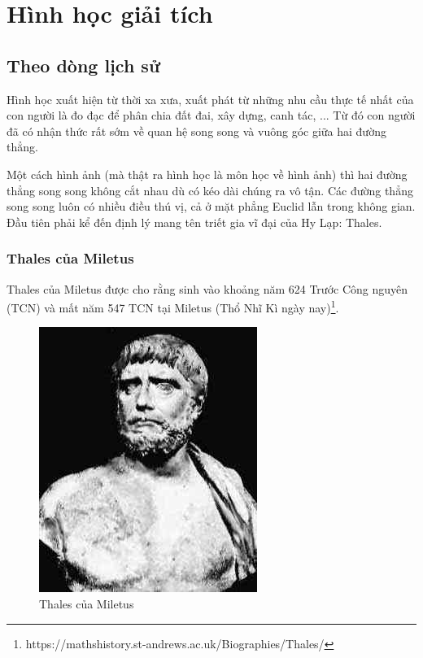 \chapter{Hình học giải tích}

\section{Theo dòng lịch sử}

Hình học xuất hiện từ thời xa xưa, xuất phát từ những nhu cầu thực tế nhất của con người là đo đạc để phân chia đất đai, xây dựng, canh tác, ... Từ đó con người đã có nhận thức rất sớm về quan hệ song song và vuông góc giữa hai đường thẳng.

Một cách hình ảnh (mà thật ra hình học là môn học về hình ảnh) thì hai đường thẳng song song không cắt nhau dù có kéo dài chúng ra vô tận. Các đường thẳng song song luôn có nhiều điều thú vị, cả ở mặt phẳng Euclid lẫn trong không gian. Đầu tiên phải kể đến định lý mang tên triết gia vĩ đại của Hy Lạp: Thales.

\subsection*{Thales của Miletus}

Thales của Miletus được cho rằng sinh vào khoảng năm 624 Trước Công nguyên (TCN) và mất năm 547 TCN tại Miletus (Thổ Nhĩ Kì ngày nay)\footnote{https://mathshistory.st-andrews.ac.uk/Biographies/Thales/}.

\begin{figure}[ht]
	\centering
	\includegraphics[scale=0.5]{analytic_geometry/Thales.jpeg}
	\caption{Thales của Miletus}
\end{figure}

